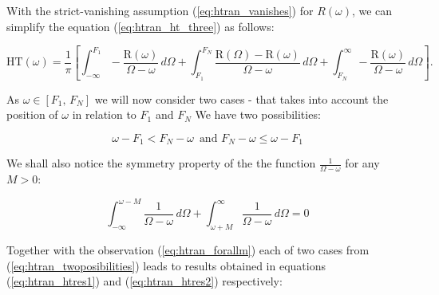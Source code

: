 \documentclass[12pt,twoside,a4paper]{article}
\numberwithin{equation}{subsection}
\numberwithin{figure}{subsection}
\begin{document}
With the strict-vanishing assumption (\ref{eq:htran_vanishes}) for $R(\omega)$, we can simplify the equation (\ref{eq:htran_ht_three}) as
follows:

\begin{equation} \label{eq:htran_ht}
  \mathrm{HT}(\omega ) = \frac{1}{\pi } \left[ 
    \int_{ -\infty }^{F_1} - \frac {\mathrm{R}(\omega )}{\Omega - \omega }\,d\Omega
  + \int_{ F_1 }^{ F_N }     \frac {\mathrm{R}(\Omega ) - \mathrm{R}(\omega )}{\Omega - \omega }\,d\Omega 
  + \int_{ F_N }^{ \infty} - \frac {\mathrm{R}(\omega )}{\Omega - \omega }\,d\Omega 
  \right] .
\end{equation}

As $\omega  \in [F_1, \,F_N]$  we will now consider two cases - that takes into account the position of  $\omega $ in relation to $F_1$  and
$F_N$ We have two possibilities:

\begin{equation}   \label{eq:htran_twoposibilities}
	\omega - F_1 < F_N - \omega \, \text{ and } F_N - \omega \leq \omega - F_1 
\end{equation}

We shall also notice the symmetry property of the the function $\frac {1}{\Omega - \omega }$ for any $M > 0$:

\begin{equation} \label{eq:htran_forallm}
    \int_{ -\infty}^{\omega - M}\frac {1}{\Omega - \omega}\,d\Omega 
  + \int_{\omega + M}^{ \infty }\frac {1}{\Omega - \omega}\,d\Omega = 0
\end{equation}

Together with the observation (\ref{eq:htran_forallm}) each of two cases from (\ref{eq:htran_twoposibilities}) leads to results obtained
in equations (\ref{eq:htran_htres1}) and (\ref{eq:htran_htres2}) respectively:
\end{document}

